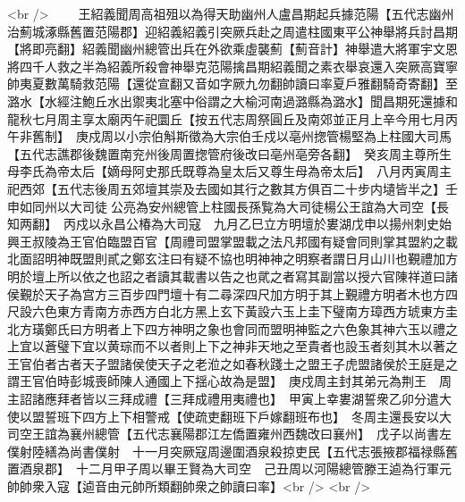 <br />
　　王紹義聞周高祖殂以為得天助幽州人盧昌期起兵據范陽【五代志幽州治薊城涿縣舊置范陽郡】迎紹義紹義引突厥兵赴之周遣柱國東平公神舉將兵討昌期【將即亮翻】紹義聞幽州總管出兵在外欲乘虛襲薊【薊音計】神舉遣大將軍宇文恩將四千人救之半為紹義所殺會神舉克范陽擒昌期紹義聞之素衣舉哀還入突厥高寶寧帥夷夏數萬騎救范陽【還從宣翻又音如字厥九勿翻帥讀曰率夏戶雅翻騎奇寄翻】至潞水【水經注鮑丘水出禦夷北塞中俗謂之大榆河南過潞縣為潞水】聞昌期死還據和龍秋七月周主享太廟丙午祀圜丘【按五代志周祭圓丘及南郊並正月上辛今用七月丙午非舊制】　庚戍周以小宗伯斛斯徵為大宗伯壬戍以亳州揔管楊堅為上柱國大司馬【五代志譙郡後魏置南兖州後周置揔管府後改曰亳州亳旁各翻】　癸亥周主尊所生母李氏為帝太后【嫡母阿史那氏既尊為皇太后又尊生母為帝太后】　八月丙寅周主祀西郊【五代志後周五郊壇其崇及去國如其行之數其方俱百二十步内壝皆半之】壬申如同州以大司徒公亮為安州總管上柱國長孫覧為大司徒楊公王誼為大司空【長知两翻】　丙戍以永昌公椿為大司寇　九月乙巳立方明壇於婁湖戊申以揚州刺史始興王叔陵為王官伯臨盟百官【周禮司盟掌盟載之法凡邦國有疑會同則掌其盟約之載北面詔明神既盟則貳之鄭玄注曰有疑不協也明神神之明察者謂日月山川也覲禮加方明於壇上所以依之也詔之者讀其載書以告之也貮之者寫其副當以授六官陳祥道曰諸侯覲於天子為宫方三百步四門壇十有二尋深四尺加方明于其上覲禮方明者木也方四尺設六色東方青南方赤西方白北方黑上玄下黃設六玉上圭下璧南方璋西方琥東方圭北方璜鄭氏曰方明者上下四方神明之象也會同而盟明神監之六色象其神六玉以禮之上宜以蒼璧下宜以黄琮而不以者則上下之神非天地之至貴者也設玉者刻其木以著之王官伯者古者天子盟諸侯使天子之老涖之如春秋踐土之盟王子虎盟諸侯於王庭是之謂王官伯時彭城喪師陳人通國上下揺心故為是盟】　庚戍周主封其弟元為荆王　周主詔諸應拜者皆以三拜成禮【三拜成禮用夷禮也】　甲寅上幸婁湖誓衆乙卯分遣大使以盟誓班下四方上下相警戒【使疏吏翻班下戶嫁翻班布也】　冬周主還長安以大司空王誼為襄州總管【五代志襄陽郡江左僑置雍州西魏改曰襄州】　戊子以尚書左僕射陸繕為尚書僕射　十一月突厥寇周邊圍酒泉殺掠吏民【五代志張掖郡福禄縣舊置酒泉郡】　十二月甲子周以畢王賢為大司空　己丑周以河陽總管滕王逌為行軍元帥帥衆入寇【逌音由元帥所類翻帥衆之帥讀曰率】<br />
<br />

